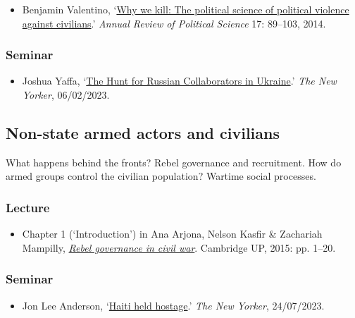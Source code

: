 \documentclass[12pt, a4paper]{article}
\begin{document}
\begin{itemize}
\setlength\itemsep{0pt}
\item Benjamin Valentino, `\href{https://doi.org/10.1146/annurev-polisci-082112-141937}{Why we kill: The political science of political violence against civilians}.' \textit{Annual Review of Political Science} 17: 89--103, 2014.
\end{itemize}

\subsubsection*{Seminar}

\begin{itemize}
\setlength\itemsep{0pt}
\item Joshua Yaffa, `\href{https://www.newyorker.com/magazine/2023/02/06/the-hunt-for-russian-collaborators-in-ukraine}{The Hunt for Russian Collaborators in Ukraine}.' \textit{The New Yorker}, 06/02/2023.
\end{itemize}

\hline %

\subsection{Non-state armed actors and civilians}\label{rebels}

What happens behind the fronts? Rebel governance and recruitment. How do armed groups control the civilian population? Wartime social processes.

\subsubsection*{Lecture}

\begin{itemize}
\setlength\itemsep{0pt}
\item Chapter 1 (`Introduction') in Ana Arjona, Nelson Kasfir \& Zachariah Mampilly, \href{https://doi.org/10.1017/CBO9781316182468}{\textit{Rebel governance in civil war}}. Cambridge UP, 2015: pp. 1--20.
\end{itemize}

\subsubsection*{Seminar}

\begin{itemize}
\setlength\itemsep{-5pt}
\item Jon Lee Anderson, `\href{https://www.newyorker.com/magazine/2023/07/24/haiti-held-hostage}{Haiti held hostage}.' \textit{The New Yorker}, 24/07/2023.
\end{itemize}
\end{document}
